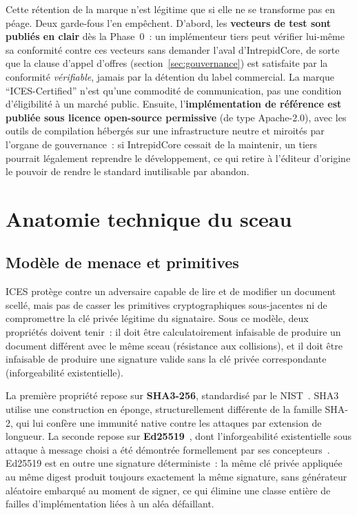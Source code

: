 \documentclass[11pt,a4paper]{article}
\begin{document}
Cette rétention de la marque n'est légitime que si elle ne se transforme pas en péage. Deux garde-fous l'en empêchent. D'abord, les \textbf{vecteurs de test sont publiés en clair} dès la Phase~0~: un implémenteur tiers peut vérifier lui-même sa conformité contre ces vecteurs sans demander l'aval d'IntrepidCore, de sorte que la clause d'appel d'offres (section~\ref{sec:gouvernance}) est satisfaite par la conformité \emph{vérifiable}, jamais par la détention du label commercial. La marque \enquote{ICES-Certified} n'est qu'une commodité de communication, pas une condition d'éligibilité à un marché public. Ensuite, l'\textbf{implémentation de référence est publiée sous licence open-source permissive} (de type Apache-2.0), avec les outils de compilation hébergés sur une infrastructure neutre et miroités par l'organe de gouvernance~: si IntrepidCore cessait de la maintenir, un tiers pourrait légalement reprendre le développement, ce qui retire à l'éditeur d'origine le pouvoir de rendre le standard inutilisable par abandon.

\section{Anatomie technique du sceau}\label{sec:anatomie}

\subsection{Modèle de menace et primitives}\label{sec:primitives}

ICES protège contre un adversaire capable de lire et de modifier un document scellé, mais pas de casser les primitives cryptographiques sous-jacentes ni de compromettre la clé privée légitime du signataire. Sous ce modèle, deux propriétés doivent tenir~: il doit être calculatoirement infaisable de produire un document différent avec le même sceau (résistance aux collisions), et il doit être infaisable de produire une signature valide sans la clé privée correspondante (inforgeabilité existentielle).

La première propriété repose sur \textbf{SHA3-256}, standardisé par le NIST~\cite{fips202}. SHA3 utilise une construction en éponge, structurellement différente de la famille SHA-2, qui lui confère une immunité native contre les attaques par extension de longueur. La seconde repose sur \textbf{Ed25519}~\cite{rfc8032}, dont l'inforgeabilité existentielle sous attaque à message choisi a été démontrée formellement par ses concepteurs~\cite{bernstein2012eddsa}. Ed25519 est en outre une signature déterministe~: la même clé privée appliquée au même digest produit toujours exactement la même signature, sans générateur aléatoire embarqué au moment de signer, ce qui élimine une classe entière de failles d'implémentation liées à un aléa défaillant.
\end{document}
